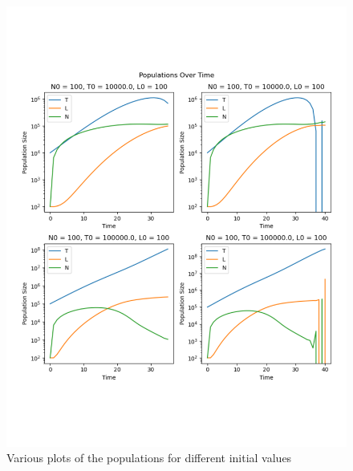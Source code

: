 \documentclass[11pt]{amsart}
\begin{document}
\begin{figure}[h!]
\begin{center} %
\includegraphics[scale=.6]{./images/forward_immune.pdf} %
\end{center}
\caption{Various plots of the populations for different initial values}
\label{fig:forward} %
\end{figure}
\end{document}
